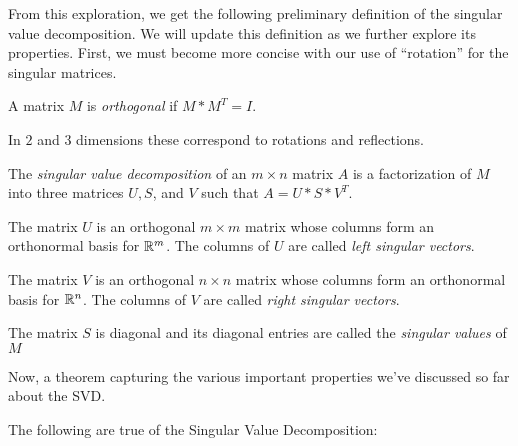 \documentclass{ximera}
\begin{document}
\begin{problem}
\begin{problem}
\begin{problem}
\begin{feedback}
  \end{feedback}

\end{problem}

From this exploration, we get the following preliminary definition of the singular value decomposition. We will update this definition as we further explore its properties. First, we must become more concise with our use of ``rotation'' for the singular matrices.

\begin{definition}

  A matrix $M$ is \emph{orthogonal} if $M*M^T=I$. 

  In $2$ and $3$ dimensions these correspond to rotations and reflections.

\end{definition}

\begin{definition}

  The \emph{singular value decomposition} of an $m\times n$ matrix $A$ is a factorization of $M$ into three matrices $U, S$, and $V$ such that $A=U*S*V^T$.

  The matrix $U$ is an orthogonal $m\times m$ matrix whose columns form an orthonormal basis for $\mathbb{R}^m$. The columns of $U$ are called \emph{left singular vectors}.

  The matrix $V$ is an orthogonal $n\times n$ matrix whose columns form an orthonormal basis for $\mathbb{R}^n$. The columns of $V$ are called \emph{right singular vectors}.

  The matrix $S$ is diagonal and its diagonal entries are called the \emph{singular values} of $M$

\end{definition}

Now, a theorem capturing the various important properties we've discussed so far about the SVD.

\begin{theorem}

  The following are true of the Singular Value Decomposition:


\end{theorem}
\end{problem}
\end{problem}
\end{document}
